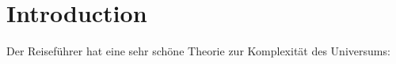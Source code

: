 \chapter{Introduction}
\label{chap:Introduction}


Der Reiseführer  hat eine sehr schöne Theorie zur Komplexität des Universums:

